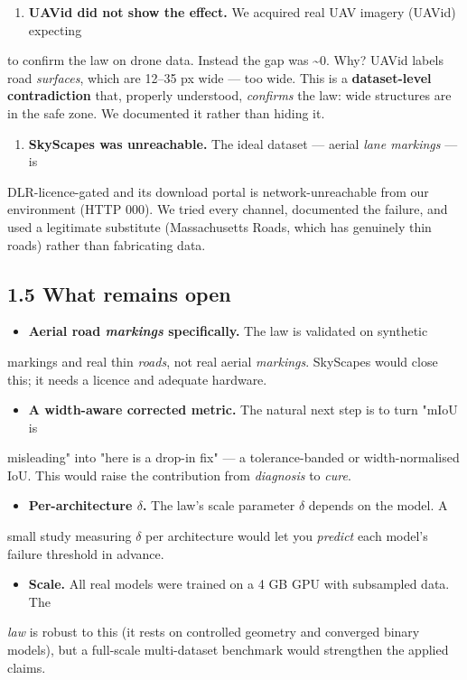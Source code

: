 \documentclass[11pt]{article}
\begin{document}
\begin{enumerate}\setlength{\itemsep}{1pt}
\item \textbf{UAVid did not show the effect.} We acquired real UAV imagery (UAVid) expecting
\end{enumerate}
   to confirm the law on drone data. Instead the gap was \textasciitilde{}0. Why? UAVid labels road    \textit{surfaces}, which are 12--35 px wide --- too wide. This is a \textbf{dataset-level    contradiction} that, properly understood, \textit{confirms} the law: wide structures    are in the safe zone. We documented it rather than hiding it.

\begin{enumerate}\setlength{\itemsep}{1pt}
\item \textbf{SkyScapes was unreachable.} The ideal dataset --- aerial \textit{lane markings} --- is
\end{enumerate}
   DLR-licence-gated and its download portal is network-unreachable from our    environment (HTTP 000). We tried every channel, documented the failure, and used    a legitimate substitute (Massachusetts Roads, which has genuinely thin roads)    rather than fabricating data.

\subsection*{1.5 What remains open}

\begin{itemize}\setlength{\itemsep}{1pt}
\item \textbf{Aerial road \textit{markings} specifically.} The law is validated on synthetic
\end{itemize}
  markings and real thin \textit{roads}, not real aerial \textit{markings}. SkyScapes would close   this; it needs a licence and adequate hardware.
\begin{itemize}\setlength{\itemsep}{1pt}
\item \textbf{A width-aware corrected metric.} The natural next step is to turn "mIoU is
\end{itemize}
  misleading" into "here is a drop-in fix" --- a tolerance-banded or width-normalised   IoU. This would raise the contribution from \textit{diagnosis} to \textit{cure}.
\begin{itemize}\setlength{\itemsep}{1pt}
\item \textbf{Per-architecture \texttt{$\delta$}.} The law's scale parameter \texttt{$\delta$} depends on the model. A
\end{itemize}
  small study measuring \texttt{$\delta$} per architecture would let you \textit{predict} each model's   failure threshold in advance.
\begin{itemize}\setlength{\itemsep}{1pt}
\item \textbf{Scale.} All real models were trained on a 4 GB GPU with subsampled data. The
\end{itemize}
  \textit{law} is robust to this (it rests on controlled geometry and converged binary   models), but a full-scale multi-dataset benchmark would strengthen the applied   claims.
\end{document}
